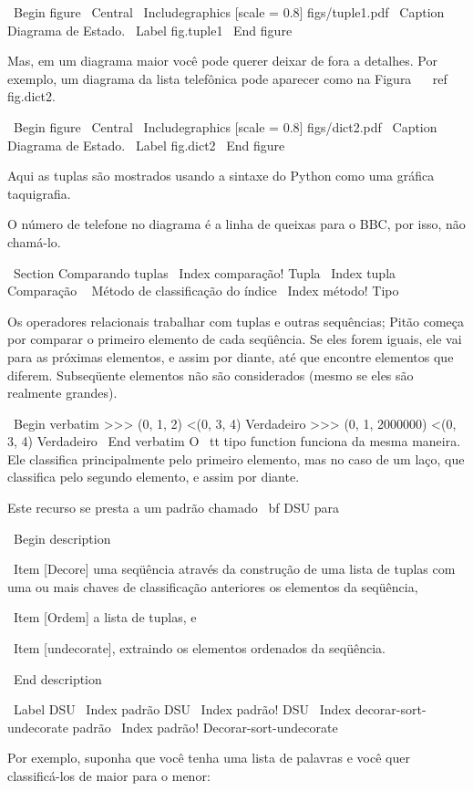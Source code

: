 \documentclass[10pt]{book}
\begin{document}
{{{{{{{{{\ Begin {figure}
\ Central
{\ Includegraphics [scale = 0.8] {figs/tuple1.pdf}}
\ Caption {Diagrama de Estado.}
\ Label {} fig.tuple1
\ End {figure}

Mas, em um diagrama maior você pode querer deixar de fora a
detalhes. Por exemplo, um diagrama da lista telefônica pode
aparecer como na Figura ~ \ ref {} fig.dict2.

\ Begin {figure}
\ Central
{\ Includegraphics [scale = 0.8] {figs/dict2.pdf}}
\ Caption {Diagrama de Estado.}
\ Label {} fig.dict2
\ End {figure}

Aqui as tuplas são mostrados usando a sintaxe do Python como uma gráfica
taquigrafia.

O número de telefone no diagrama é a linha de queixas para o
BBC, por isso, não chamá-lo.



\ Section {} Comparando tuplas
\ Index {comparação! Tupla}
\ Index {tupla Comparação}
\ {} Método de classificação do índice
\ Index {método! Tipo}

Os operadores relacionais trabalhar com tuplas e outras sequências;
Pitão começa por comparar o primeiro elemento de cada
seqüência. Se eles forem iguais, ele vai para as próximas elementos,
e assim por diante, até que encontre elementos que diferem. Subseqüente
elementos não são considerados (mesmo se eles são realmente grandes).

\ Begin {verbatim}
>>> (0, 1, 2) <(0, 3, 4)
Verdadeiro
>>> (0, 1, 2000000) <(0, 3, 4)
Verdadeiro
\ End {verbatim}
%
O {\ tt tipo} function funciona da mesma maneira. Ele classifica
principalmente pelo primeiro elemento, mas no caso de um laço, que classifica
pelo segundo elemento, e assim por diante.  

Este recurso se presta a um padrão chamado {\ bf DSU} para 

\ Begin {description}

\ Item [Decore] uma seqüência através da construção de uma lista de tuplas
com uma ou mais chaves de classificação anteriores os elementos da seqüência,

\ Item [Ordem] a lista de tuplas, e

\ Item [undecorate], extraindo os elementos ordenados da seqüência.

\ End {description}

\ Label {} DSU
\ Index {padrão DSU}
\ Index {padrão! DSU}
\ Index {decorar-sort-undecorate padrão}
\ Index {padrão! Decorar-sort-undecorate}

Por exemplo, suponha que você tenha uma lista de palavras e você quer
classificá-los de maior para o menor:

}}}}}}}}}
\end{document}
